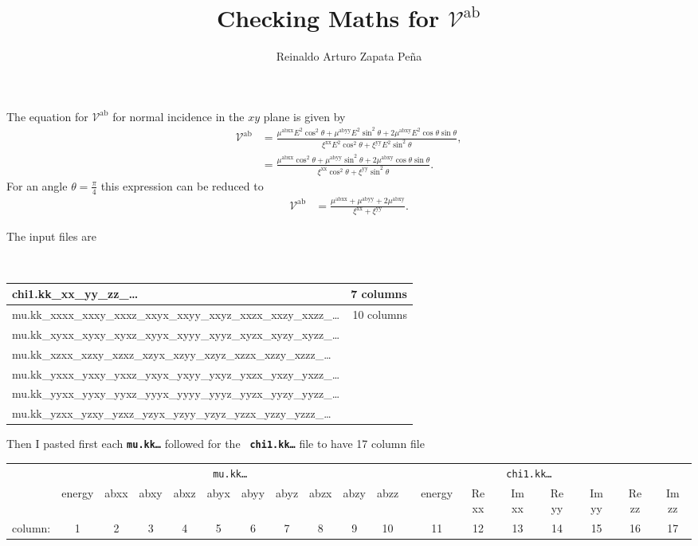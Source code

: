 \documentclass[landscape]{article}
\author{Reinaldo Arturo Zapata Pe\~na}
\title{Checking Maths for $\mathcal{V}^{\mathrm{ab}}$}
\date{}
\begin{document}
\maketitle

The equation for $\mathcal{V}^{\mathrm{ab}}$ for normal incidence in the $xy$
plane is given by
\begin{align*}
\mathcal{V}^{\mathrm{ab}} 
&= \frac{\mu^{\mathrm{abxx}}E^{2}\cos^{2}\theta + 
\mu^{\mathrm{abyy}}E^{2}\sin^{2}\theta + 
2\mu^{\mathrm{abxy}}E^{2}\cos\theta\sin\theta }
{\xi^{\mathrm{xx}}E^{2}\cos^{2}\theta + \xi^{\mathrm{yy}}E^{2}\sin^{2}\theta}, \\
&= \frac{\mu^{\mathrm{abxx}}\cos^{2}\theta + 
\mu^{\mathrm{abyy}}\sin^{2}\theta + 2\mu^{\mathrm{abxy}}\cos\theta\sin\theta }
{\xi^{\mathrm{xx}}\cos^{2}\theta + \xi^{\mathrm{yy}}\sin^{2}\theta}.
\end{align*}
For an angle $\theta = \frac{\pi}{4}$ this expression can be reduced to 
\begin{align*}
\mathcal{V}^{\mathrm{ab}} 
&= \frac{\mu^{\mathrm{abxx}} + \mu^{\mathrm{abyy}} + 2\mu^{\mathrm{abxy}}}
{\xi^{\mathrm{xx}} + \xi^{\mathrm{yy}}}.
\end{align*}

The input files are

{\tt
\begin{tabular}{lr}
chi1.kk\_xx\_yy\_zz\_\ldots &  {\rm 7 columns} \\
\hline
mu.kk\_xxxx\_xxxy\_xxxz\_xxyx\_xxyy\_xxyz\_xxzx\_xxzy\_xxzz\_\ldots & {\rm 10 columns}\\
mu.kk\_xyxx\_xyxy\_xyxz\_xyyx\_xyyy\_xyyz\_xyzx\_xyzy\_xyzz\_\ldots & \\
mu.kk\_xzxx\_xzxy\_xzxz\_xzyx\_xzyy\_xzyz\_xzzx\_xzzy\_xzzz\_\ldots & \\
mu.kk\_yxxx\_yxxy\_yxxz\_yxyx\_yxyy\_yxyz\_yxzx\_yxzy\_yxzz\_\ldots & \\
mu.kk\_yyxx\_yyxy\_yyxz\_yyyx\_yyyy\_yyyz\_yyzx\_yyzy\_yyzz\_\ldots & \\
mu.kk\_yzxx\_yzxy\_yzxz\_yzyx\_yzyy\_yzyz\_yzzx\_yzzy\_yzzz\_\ldots & \\
\end{tabular}
}

\vspace{0.5cm}
Then I pasted first each \textbf{\tt mu.kk\ldots} followed for the \textbf{\tt
chi1.kk\ldots} file to have 17 column file

\vspace{0.5cm}
{\footnotesize
\begin{tabular}{lcccccccccccccccccc}
& \multicolumn{10}{c}{\tt mu.kk\ldots} & \multicolumn{7}{c}{\tt chi1.kk\ldots} \\
\cline {2-11} \cline{13-19}
&energy & abxx & abxy & abxz & abyx & abyy & abyz & abzx & abzy & abzz & &
energy & Re xx & Im xx & Re yy & Im yy & Re zz & Im zz \\
column: & 1& 2& 3& 4& 5& 6& 7& 8& 9& 10 & & 11& 12& 13& 14& 15& 16& 17\\
\end{tabular}
}
\end{document}
